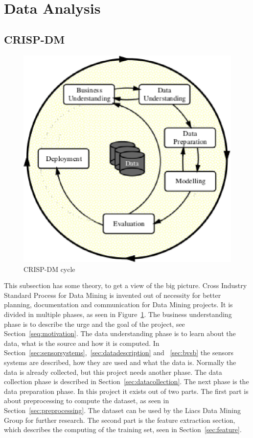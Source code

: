 \section{Data Analysis}
	\subsection{CRISP-DM}
	\label{sec:datamodeling}
	\begin{figure}[h]
		\centering
		\includegraphics[scale=0.75]{crispdm.eps}
					
		\caption{CRISP-DM \cite{wirth2000crisp} cycle}
		\label{fig:crispdm}

	\end{figure}
	This subsection has some theory, to get a view of the big picture. Cross Industry Standard Process for Data Mining \cite{wirth2000crisp} is invented out of necessity for better planning, documentation and communication for Data Mining projects. It is divided in multiple phases, as seen in Figure~\ref{fig:crispdm}. The business understanding phase is to describe the urge and the goal of the project, see Section~\ref{seq:motivation}. The data understanding phase is to learn about the data, what is the source and how it is computed. In Section~\ref{sec:sensorsystems},~\ref{sec:datadescription} and ~\ref{sec:bvsb} the sensors systems are described, how they are used and what the data is. Normally the data is already collected, but this project needs another phase. The data collection phase is described in Section~\ref{sec:datacollection}. The next phase is the data preparation phase. In this project it exists out of two parts. The first part is about preprocessing to compute the dataset, as seen in Section~\ref{sec:preprocessing}. The dataset can be used by the Liacs Data Mining Group for further research. The second part is the feature extraction section, which describes the computing of the training set, seen in Section~\ref{sec:feature}. 
